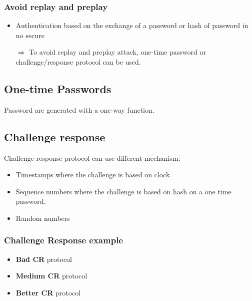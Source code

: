 \subsubsection{Avoid replay and preplay}
\begin{itemize}
    \item Authentication based on the exchange of a password or hash of
        password in no secure
    \item[$\Rightarrow$]
        To avoid replay and preplay attack, one-time password or
        challenge/response protocol can be used.
\end{itemize}


\subsection{One-time Passwords}
Password are generated with a one-way function.

\subsection{Challenge response}
Challenge response protocol can use different mechanism:
\begin{itemize}
    \item Timestamps where the challenge is based on clock.
    \item Sequence numbers where the challenge is based on hash on a
        one time password.
    \item Random numbers
\end{itemize}

\subsubsection{Challenge Response example}
\begin{itemize}
    \item \textbf{Bad CR} protocol

    \item \textbf{Medium CR} protocol

    \item \textbf{Better CR} protocol
\end{itemize}


